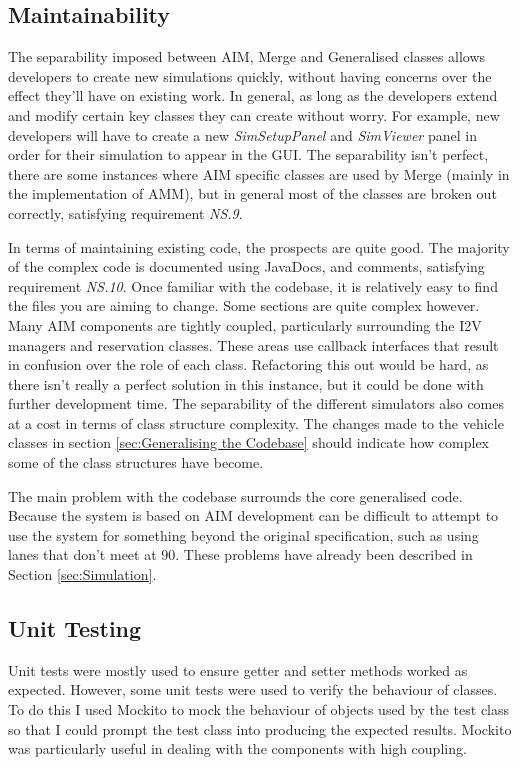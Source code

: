 \subsection{Maintainability}
\label{subsec:Maintainability}
The separability imposed between AIM, Merge and Generalised classes allows developers to create new simulations quickly, without having concerns over the effect they'll have on existing work. In general, as long as the developers extend and modify certain key classes they can create without worry. For example, new developers will have to create a new \emph{SimSetupPanel} and \emph{SimViewer} panel in order for their simulation to appear in the GUI. The separability isn't perfect, there are some instances where AIM specific classes are used by Merge (mainly in the implementation of AMM), but in general most of the classes are broken out correctly, satisfying requirement \emph{NS.9}.

In terms of maintaining existing code, the prospects are quite good. The  majority of the complex code is documented using JavaDocs, and comments, satisfying requirement \emph{NS.10}. Once familiar with the codebase, it is relatively easy to find the files you are aiming to change. Some sections are quite complex however. Many AIM components are tightly coupled, particularly surrounding the I2V managers and reservation classes. These areas use callback interfaces that result in confusion over the role of each class. Refactoring this out would be hard, as there isn't really a perfect solution in this instance, but it could be done with further development time. The separability of the different simulators also comes at a cost in terms of class structure complexity. The changes made to the vehicle classes in section \ref{sec:Generalising the Codebase} should indicate how complex some of the class structures have become.

The main problem with the codebase surrounds the core generalised code. Because the system is based on AIM development can be difficult to attempt to use the system for something beyond the original specification, such as using lanes that don't meet at 90\degree. These problems have already been described in Section \ref{sec:Simulation}.

\subsection{Unit Testing}
\label{subsec:Unit Testing}
Unit tests were mostly used to ensure getter and setter methods worked as expected. However, some unit tests were used to verify the behaviour of classes. To do this I used Mockito \citep{MockitoWebsite} to mock the behaviour of objects used by the test class so that I could prompt the test class into producing the expected results. Mockito was particularly useful in dealing with the components with high coupling.

